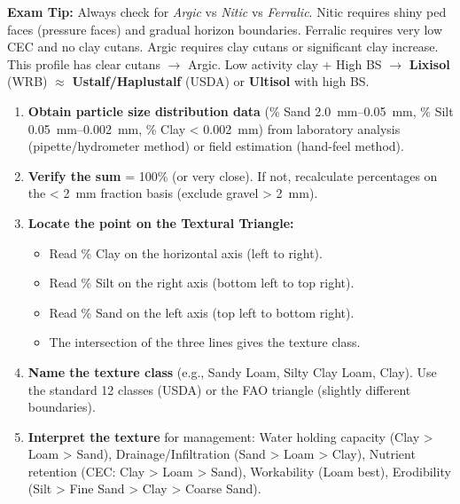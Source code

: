 \documentclass[11pt]{article}
\begin{document}
\begin{exoresolu}
\noindent\textbf{Exam Tip:} Always check for \emph{Argic} vs \emph{Nitic} vs \emph{Ferralic}. Nitic requires shiny ped faces (pressure faces) and gradual horizon boundaries. Ferralic requires very low CEC and no clay cutans. Argic requires clay cutans or significant clay increase. This profile has clear cutans $\rightarrow$ Argic. Low activity clay + High BS $\rightarrow$ \textbf{Lixisol} (WRB) $\approx$ \textbf{Ustalf/Haplustalf} (USDA) or \textbf{Ultisol} with high BS.
\end{exoresolu}

\begin{methode}
\begin{enumerate}
\item \textbf{Obtain particle size distribution data} (\% Sand \SIrange{2.0}{0.05}{mm}, \% Silt \SIrange{0.05}{0.002}{mm}, \% Clay < \SI{0.002}{mm}) from laboratory analysis (pipette/hydrometer method) or field estimation (hand-feel method).
\item \textbf{Verify the sum} = 100\% (or very close). If not, recalculate percentages on the < \SI{2}{mm} fraction basis (exclude gravel > \SI{2}{mm}).
\item \textbf{Locate the point on the Textural Triangle:}
      \begin{itemize}
      \item Read \% Clay on the horizontal axis (left to right).
      \item Read \% Silt on the right axis (bottom left to top right).
      \item Read \% Sand on the left axis (top left to bottom right).
      \item The intersection of the three lines gives the texture class.
      \end{itemize}
\item \textbf{Name the texture class} (e.g., Sandy Loam, Silty Clay Loam, Clay). Use the standard 12 classes (USDA) or the FAO triangle (slightly different boundaries).
\item \textbf{Interpret the texture} for management: Water holding capacity (Clay > Loam > Sand), Drainage/Infiltration (Sand > Loam > Clay), Nutrient retention (CEC: Clay > Loam > Sand), Workability (Loam best), Erodibility (Silt > Fine Sand > Clay > Coarse Sand).
\end{enumerate}
\end{methode}
\end{document}
